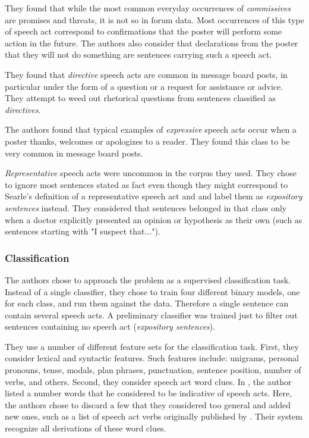 \documentclass[11pt]{article}
\begin{document}
They found that while the most common everyday occurrences of \textit{commissives} are promises and threats, it is not so in forum data. Most occurrences of this type of speech act correspond to confirmations that the poster will perform some action in the future. The authors also consider that declarations from the poster that they will not do something are sentences carrying such a speech act.

They found that \textit{directive} speech acts are common in message board posts, in particular under the form of a question or a request for assistance or advice. They attempt to weed out rhetorical questions from sentences classified as \textit{directives}.

The authors found that typical examples of \textit{expressive} speech acts occur when a poster thanks, welcomes or apologizes to a reader. They found this class to be very common in message board posts.

\textit{Representative} speech acts were uncommon in the corpus they used. They chose to ignore most sentences stated as fact even though they might correspond to Searle's definition of a representative speech act and and label them as \textit{expository sentences} instead. They considered that sentences belonged in that class only when a doctor explicitly presented an opinion or hypothesis as their own (such as sentences starting with "I suspect that...").

\subsubsection{Classification}

The authors chose to approach the problem as a supervised classification task. Instead of a single classifier, they chose to train four different binary models, one for each class, and run them against the data. Therefore a single sentence can contain several speech acts. A preliminary classifier was trained just to filter out sentences containing no speech act (\textit{expository sentences}).

They use a number of different feature sets for the classification task. First, they consider lexical and syntactic features. Such features include: unigrams, personal pronouns, tense, modals, plan phrases, punctuation, sentence position, number of verbs, and others. Second, they consider speech act word clues. In \cite{searle1976taxonomy}, the author listed a number words that he considered to be indicative of speech acts. Here, the authors chose to discard a few that they considered too general and added new ones, such as a list of speech act verbs originally published by \cite{wierzbicka1987english}. Their system recognize all derivations of these word clues.
\end{document}
